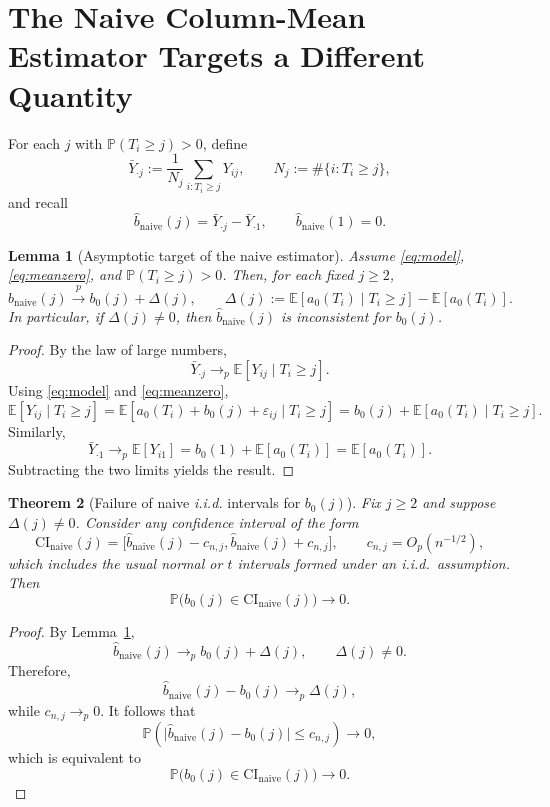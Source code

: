 \documentclass[sigconf,anonymous,review]{acmart}
\newtheorem{theorem}{Theorem}[section]
\newtheorem{lemma}[theorem]{Lemma}
\begin{document}
\section{The Naive Column-Mean Estimator Targets a Different Quantity}

For each $j$ with $\mathbb{P}(T_i\ge j)>0$, define
\[
\bar Y_{\cdot j}
:=
\frac{1}{N_j}\sum_{i:T_i\ge j} Y_{ij},
\qquad
N_j:=\#\{i:T_i\ge j\},
\]
and recall
\[
\hat b_{\mathrm{naive}}(j)
=
\bar Y_{\cdot j}-\bar Y_{\cdot 1},
\qquad
\hat b_{\mathrm{naive}}(1)=0.
\]

\begin{lemma}[Asymptotic target of the naive estimator]
\label{lem:naive-target}
Assume \eqref{eq:model}, \eqref{eq:meanzero}, and $\mathbb{P}(T_i\ge j)>0$. Then, for each fixed $j\ge 2$,
\[
\hat b_{\mathrm{naive}}(j)
\xrightarrow{p}
b_0(j)+\Delta(j),
\qquad
\Delta(j):=
\mathbb{E}[a_0(T_i)\mid T_i\ge j]-\mathbb{E}[a_0(T_i)].
\]
In particular, if $\Delta(j)\neq 0$, then $\hat b_{\mathrm{naive}}(j)$ is inconsistent for $b_0(j)$.
\end{lemma}

\begin{proof}
By the law of large numbers,
\[
\bar Y_{\cdot j}\to_p \mathbb{E}[Y_{ij}\mid T_i\ge j].
\]
Using \eqref{eq:model} and \eqref{eq:meanzero},
\[
\mathbb{E}[Y_{ij}\mid T_i\ge j]
=
\mathbb{E}[a_0(T_i)+b_0(j)+\varepsilon_{ij}\mid T_i\ge j]
=
b_0(j)+\mathbb{E}[a_0(T_i)\mid T_i\ge j].
\]
Similarly,
\[
\bar Y_{\cdot 1}\to_p \mathbb{E}[Y_{i1}]
=
b_0(1)+\mathbb{E}[a_0(T_i)]
=
\mathbb{E}[a_0(T_i)].
\]
Subtracting the two limits yields the result.
\end{proof}

\begin{theorem}[Failure of naive \emph{i.i.d.} intervals for $b_0(j)$]
\label{thm:naive-coverage}
Fix $j\ge 2$ and suppose $\Delta(j)\neq 0$. Consider any confidence interval of the form
\[
\mathrm{CI}_{\mathrm{naive}}(j)
=
\bigl[
\hat b_{\mathrm{naive}}(j)-c_{n,j},
\hat b_{\mathrm{naive}}(j)+c_{n,j}
\bigr],
\qquad
c_{n,j}=O_p(n^{-1/2}),
\]
which includes the usual normal or $t$ intervals formed under an i.i.d.\ assumption. Then
\[
\mathbb{P}\bigl(b_0(j)\in \mathrm{CI}_{\mathrm{naive}}(j)\bigr)\to 0.
\]
\end{theorem}

\begin{proof}
By Lemma~\ref{lem:naive-target},
\[
\hat b_{\mathrm{naive}}(j)\to_p b_0(j)+\Delta(j),
\qquad
\Delta(j)\neq 0.
\]
Therefore,
\[
\hat b_{\mathrm{naive}}(j)-b_0(j)\to_p \Delta(j),
\]
while $c_{n,j}\to_p 0$. It follows that
\[
\mathbb{P}\!\left(
\bigl|\hat b_{\mathrm{naive}}(j)-b_0(j)\bigr|\le c_{n,j}
\right)\to 0,
\]
which is equivalent to
\[
\mathbb{P}\bigl(b_0(j)\in \mathrm{CI}_{\mathrm{naive}}(j)\bigr)\to 0.
\]
\end{proof}
\end{document}
